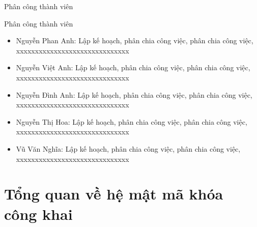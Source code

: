 \documentclass{beamer}
\numberwithin{equation}{section}
\begin{document}
\begin{frame}{Phân công thành viên}
\begin{block}{Phân công thành viên}
\begin{itemize}
\item Nguyễn Phan Anh: Lập kế hoạch, phân chia công việc, phân chia công việc, xxxxxxxxxxxxxxxxxxxxxxxxxxxxxx
\item Nguyễn Việt Anh: Lập kế hoạch, phân chia công việc, phân chia công việc, xxxxxxxxxxxxxxxxxxxxxxxxxxxxxx
\item Nguyễn Đình Anh: Lập kế hoạch, phân chia công việc, phân chia công việc, xxxxxxxxxxxxxxxxxxxxxxxxxxxxxx
\item Nguyễn Thị Hoa: Lập kế hoạch, phân chia công việc, phân chia công việc, xxxxxxxxxxxxxxxxxxxxxxxxxxxxxx
\item Vũ Văn Nghĩa: Lập kế hoạch, phân chia công việc, phân chia công việc, xxxxxxxxxxxxxxxxxxxxxxxxxxxxxx
\end{itemize}
\end{block}
\end{frame}
\section{Tổng quan về hệ mật mã khóa công khai}
\end{document}

